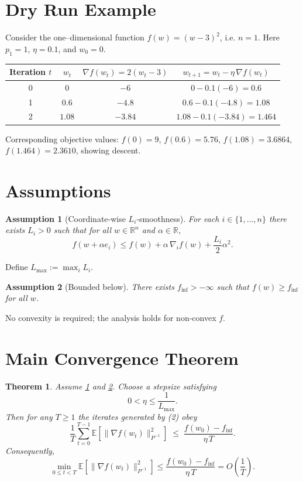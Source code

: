 \documentclass{article}
\newtheorem{theorem}{Theorem}
\newtheorem{assumption}{Assumption}
\begin{document}
\section*{Dry Run Example}
Consider the one–dimensional function $f(w)=(w-3)^{2}$, i.e. $n=1$.  
Here $p_1=1$, $\eta=0.1$, and $w_{0}=0$.

\begin{center}
\begin{tabular}{c|c|c|c}
Iteration $t$ & $w_t$ & $\nabla f(w_t)=2(w_t-3)$ & $w_{t+1}=w_t-\eta\,\nabla f(w_t)$\\\hline
0 & $0$ & $-6$ & $0-0.1(-6)=0.6$\\
1 & $0.6$ & $-4.8$ & $0.6-0.1(-4.8)=1.08$\\
2 & $1.08$ & $-3.84$ & $1.08-0.1(-3.84)=1.464$\\
\end{tabular}
\end{center}
Corresponding objective values: $f(0)=9$, $f(0.6)=5.76$, $f(1.08)=3.6864$, $f(1.464)=2.3610$,
showing descent.

\section*{Assumptions}
\begin{assumption}[Coordinate‑wise $L_i$‑smoothness]\label{ass:smooth}
For each $i\in\{1,\dots ,n\}$ there exists $L_i>0$ such that for all $w\in\mathbb{R}^{n}$ and $\alpha\in\mathbb{R}$,
\[
f(w+\alpha e_i)\le f(w)+\alpha\,\nabla_i f(w)+\frac{L_i}{2}\alpha^{2}.      \tag{3}
\]
\end{assumption}
Define $L_{\max}:=\max_{i}L_i$.

\begin{assumption}[Bounded below]\label{ass:lb}
There exists $f_{\inf}>-\infty$ such that $f(w)\ge f_{\inf}$ for all $w$.
\end{assumption}

No convexity is required; the analysis holds for non‑convex $f$.

\section*{Main Convergence Theorem}
\begin{theorem}\label{thm:main}
Assume \ref{ass:smooth} and \ref{ass:lb}. Choose a stepsize satisfying
\[
0<\eta\le\frac{1}{L_{\max}}.                                     \tag{4}
\]
Then for any $T\ge1$ the iterates generated by (2) obey
\[
\frac{1}{T}\sum_{t=0}^{T-1}\mathbb{E}\!\left[\|\nabla f(w_t)\|_{P^{-1}}^{2}\right]
\;\le\;
\frac{f(w_0)-f_{\inf}}{\eta\,T}.                               \tag{5}
\]
Consequently,
\[
\min_{0\le t<T}\mathbb{E}\!\left[\|\nabla f(w_t)\|_{P^{-1}}^{2}\right]
\le \frac{f(w_0)-f_{\inf}}{\eta\,T}=O\!\left(\frac{1}{T}\right).
\]
\end{theorem}
\end{document}
